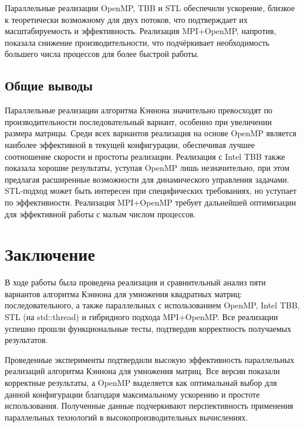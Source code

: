 \documentclass[a4paper,12pt]{article}
\begin{document}
Параллельные реализации OpenMP, TBB и STL обеспечили ускорение, близкое к теоретически возможному для двух потоков, что подтверждает их масштабируемость и эффективность. Реализация MPI+OpenMP, напротив, показала снижение производительности, что подчёркивает необходимость большего числа процессов для более быстрой работы.

\subsection{Общие выводы}

Параллельные реализации алгоритма Кэннона значительно превосходят по производительности последовательный вариант, особенно при увеличении размера матрицы. Среди всех вариантов реализация на основе OpenMP является наиболее эффективной в текущей конфигурации, обеспечивая лучшее соотношение скорости и простоты реализации. Реализация с Intel TBB также показала хорошие результаты, уступая OpenMP лишь незначительно, при этом предлагая расширенные возможности для динамического управления задачами. STL-подход может быть интересен при специфических требованиях, но уступает по эффективности. Реализация MPI+OpenMP требует дальнейшей оптимизации для эффективной работы с малым числом процессов.


\section{Заключение}
В ходе работы была проведена реализация и сравнительный анализ пяти вариантов алгоритма Кэннона для умножения квадратных матриц: последовательного, а также параллельных с использованием OpenMP, Intel TBB, STL (на std::thread) и гибридного подхода MPI+OpenMP. Все реализации успешно прошли функциональные тесты, подтвердив корректность получаемых результатов.

Проведенные эксперименты подтвердили высокую эффективность параллельных реализаций алгоритма Кэннона для умножения матриц. Все версии показали корректные результаты, а OpenMP выделяется как оптимальный выбор для данной конфигурации благодаря максимальному ускорению и простоте использования. Полученные данные подчеркивают перспективность применения параллельных технологий в высокопроизводительных вычислениях.
\end{document}
